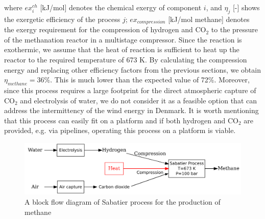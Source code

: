 \documentclass{ECOS_2021}
\begin{document}
where $ex_{i}^{ch}$ {[}kJ/mol{]} denotes the chemical exergy of component
$i$, and $\eta_{j}$ {[}-{]} shows the exergetic efficiency \cite{eftekhariExergyAnalysisUnderground2012f}
of the process $j$; $ex_{compression}$ {[}kJ/mol methane{]} denotes
the exergy requirement for the compression of hydrogen and CO$_{2}$
to the pressure of the methanation reactor in a multistage compressor.
Since the reaction is exothermic, we assume that the heat of reaction
is sufficient to heat up the reactor to the required temperature of
673 K. By calculating the compression energy and replacing other efficiency
factors from the previous sections, we obtain $\eta_{methane}=36\%$.
This is much lower than the expected value of 72\%. Moreover, since
this process requires a large footprint for the direct atmospheric
capture of CO$_{2}$ and electrolysis of water, we do not consider
it as a feasible option that can address the intermittency of the
wind energy in Denmark. It is worth mentioning that this process can
easily fit on a platform and if both hydrogen and CO$_{2}$ are provided,
e.g. via pipelines, operating this process on a platform is viable.

\begin{figure}[H]
\centering
\includegraphics[width=12cm]{sabatier}

\caption{\label{fig:methane-process}A block flow diagram of Sabatier process
for the production of methane \cite{eftekhariQuantifyingRoleLiquid2020}}
\end{figure}
\end{document}
